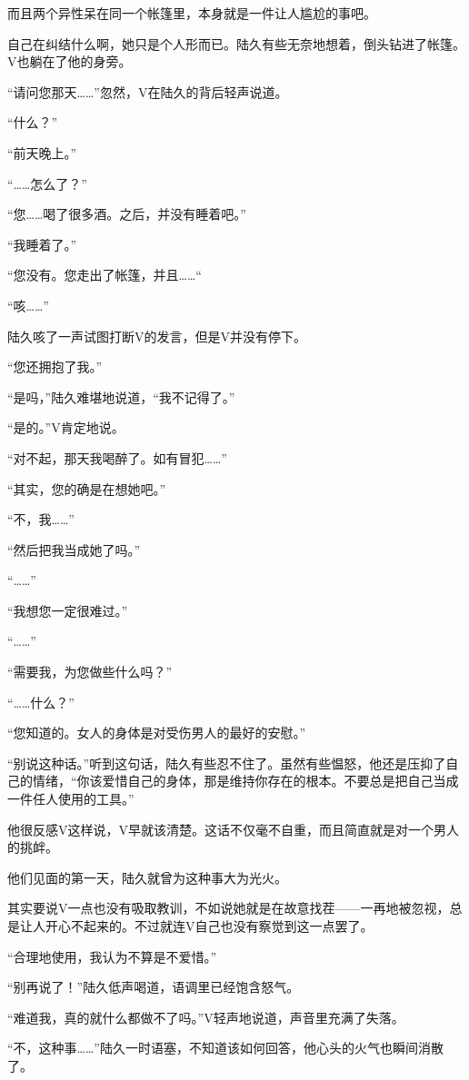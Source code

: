 而且两个异性呆在同一个帐篷里，本身就是一件让人尴尬的事吧。

自己在纠结什么啊，她只是个人形而已。陆久有些无奈地想着，倒头钻进了帐篷。V也躺在了他的身旁。

“请问您那天……”忽然，V在陆久的背后轻声说道。

“什么？”

“前天晚上。”

“……怎么了？”

“您……喝了很多酒。之后，并没有睡着吧。”

“我睡着了。”

“您没有。您走出了帐篷，并且……“

“咳……”

陆久咳了一声试图打断V的发言，但是V并没有停下。

“您还拥抱了我。”

“是吗，”陆久难堪地说道，“我不记得了。”

“是的。”V肯定地说。

“对不起，那天我喝醉了。如有冒犯……”

“其实，您的确是在想她吧。”

“不，我……”

“然后把我当成她了吗。”

“……”

“我想您一定很难过。”

“……”

“需要我，为您做些什么吗？”

“……什么？”

“您知道的。女人的身体是对受伤男人的最好的安慰。”

“别说这种话。”听到这句话，陆久有些忍不住了。虽然有些愠怒，他还是压抑了自己的情绪，“你该爱惜自己的身体，那是维持你存在的根本。不要总是把自己当成一件任人使用的工具。”

他很反感V这样说，V早就该清楚。这话不仅毫不自重，而且简直就是对一个男人的挑衅。

他们见面的第一天，陆久就曾为这种事大为光火。

其实要说V一点也没有吸取教训，不如说她就是在故意找茬——一再地被忽视，总是让人开心不起来的。不过就连V自己也没有察觉到这一点罢了。

“合理地使用，我认为不算是不爱惜。”

“别再说了！”陆久低声喝道，语调里已经饱含怒气。

“难道我，真的就什么都做不了吗。”V轻声地说道，声音里充满了失落。

“不，这种事……”陆久一时语塞，不知道该如何回答，他心头的火气也瞬间消散了。

